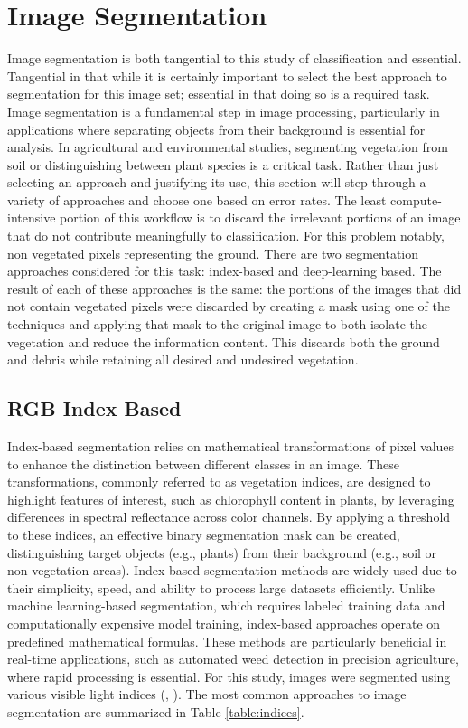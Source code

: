 \documentclass[letterpaper, notitlepage]{report}
\begin{document}
\section{Image Segmentation}
\label{section:segmentation}
Image segmentation is both tangential to this study of classification and essential. Tangential in that while it is certainly important to select the best approach to segmentation for this image set; essential in that doing so is a required task. Image segmentation is a fundamental step in image processing, particularly in applications where separating objects from their background is essential for analysis. In agricultural and environmental studies, segmenting vegetation from soil or distinguishing between plant species is a critical task. Rather than just selecting an approach and justifying its use, this section will step through a variety of approaches and choose one based on error rates. The least compute-intensive portion of this workflow is to discard the irrelevant portions of an image that do not contribute meaningfully to classification. For this problem notably, non vegetated pixels representing the ground. There are two segmentation approaches considered for this task: index-based and deep-learning based. The result of each of these approaches is the same: the portions of the images that did not contain vegetated pixels were discarded by creating a mask using one of the techniques and applying that mask to the original image to both isolate the vegetation and reduce the information content. This discards both the ground and debris while retaining all desired and undesired vegetation. 

\subsection{RGB Index Based}
Index-based segmentation relies on mathematical transformations of pixel values to enhance the distinction between different classes in an image. These transformations, commonly referred to as vegetation indices, are designed to highlight features of interest, such as chlorophyll content in plants, by leveraging differences in spectral reflectance across color channels. By applying a threshold to these indices, an effective binary segmentation mask can be created, distinguishing target objects (e.g., plants) from their background (e.g., soil or non-vegetation areas). Index-based segmentation methods are widely used due to their simplicity, speed, and ability to process large datasets efficiently. Unlike machine learning-based segmentation, which requires labeled training data and computationally expensive model training, index-based approaches operate on predefined mathematical formulas. These methods are particularly beneficial in real-time applications, such as automated weed detection in precision agriculture, where rapid processing is essential.
For this study, images were segmented using various visible light indices (\cite{Hunt2013-ih}, \cite{Hamuda2016-dw}).  The most common approaches to image segmentation are  summarized in Table \ref{table:indices}.  
\end{document}

